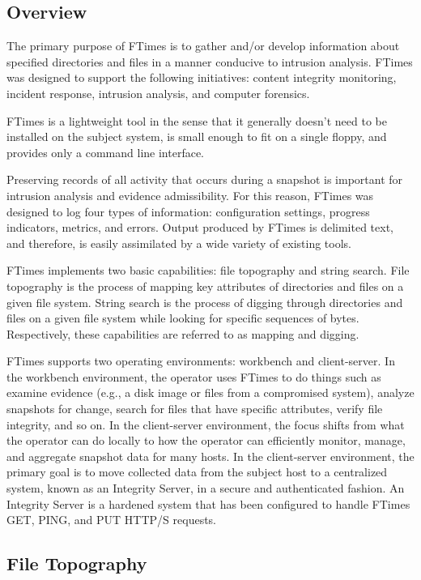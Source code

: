 \documentclass[10pt]{article}
\begin{document}
\subsection{Overview}

The primary purpose of FTimes is to gather and/or develop information
about specified directories and files in a manner conducive to
intrusion analysis.  FTimes was designed to support the following
initiatives:  content integrity monitoring, incident response,
intrusion analysis, and computer forensics.

FTimes is a lightweight tool in the sense that it generally doesn't
need to be installed on the subject system, is small enough to fit
on a single floppy, and provides only a command line interface.

Preserving records of all activity that occurs during a snapshot
is important for intrusion analysis and evidence admissibility.
For this reason, FTimes was designed to log four types of information:
configuration settings, progress indicators, metrics, and errors.
Output produced by FTimes is delimited text, and therefore, is
easily assimilated by a wide variety of existing tools.

FTimes implements two basic capabilities: file topography and string
search.  File topography is the process of mapping key attributes
of directories and files on a given file system.  String search is
the process of digging through directories and files on a given
file system while looking for specific sequences of bytes.
Respectively, these capabilities are referred to as mapping and
digging.

FTimes supports two operating environments: workbench and client-server.
In the workbench environment, the operator uses FTimes to do things
such as examine evidence (e.g., a disk image or files from a
compromised system), analyze snapshots for change, search for files
that have specific attributes, verify file integrity, and so on.
In the client-server environment, the focus shifts from what the
operator can do locally to how the operator can efficiently monitor,
manage, and aggregate snapshot data for many hosts.  In the
client-server environment, the primary goal is to move collected
data from the subject host to a centralized system, known as an
Integrity Server, in a secure and authenticated fashion.  An
Integrity Server is a hardened system that has been configured to
handle FTimes GET, PING, and PUT HTTP/S requests.

\subsection{File Topography}
\end{document}
